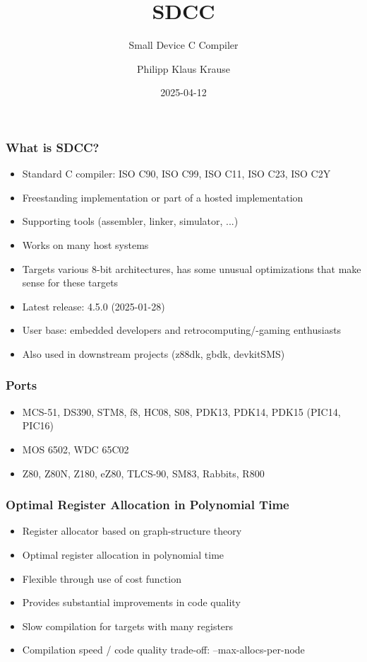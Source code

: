 \documentclass[xcolor=dvipsnames]{beamer}
\title{SDCC}
\subtitle{Small Device C Compiler}
\date{2025-04-12}
\author{Philipp Klaus Krause}
\begin{document}
\begin{frame}
	\titlepage
\end{frame}

\begin{frame}
	\frametitle{What is SDCC?}
	\begin{itemize}
		\item Standard C compiler: ISO C90, ISO C99, ISO C11, ISO C23, ISO C2Y
		\item Freestanding implementation or part of a hosted implementation
		\item Supporting tools (assembler, linker, simulator, ...)
		\item Works on many host systems
		\item Targets various 8-bit architectures, has some unusual optimizations that make sense for these targets
		\item Latest release: 4.5.0 (2025-01-28)
		\item User base: embedded developers and retrocomputing/-gaming enthusiasts
		\item Also used in downstream projects (z88dk, gbdk, devkitSMS)
	\end{itemize}
\end{frame}

\begin{frame}
	\frametitle{Ports}
	\begin{itemize}
		\item MCS-51, DS390, STM8, f8, HC08, S08, PDK13, PDK14, PDK15 (PIC14, PIC16)
		\item MOS 6502, WDC 65C02
		\item Z80, Z80N, Z180, eZ80, TLCS-90, SM83, Rabbits, R800
	\end{itemize}
\end{frame}

\begin{frame}
	\frametitle{Optimal Register Allocation in Polynomial Time}
	\begin{itemize}
		\item Register allocator based on graph-structure theory
		\item Optimal register allocation in polynomial time
		\item Flexible through use of cost function
		\item Provides substantial improvements in code quality
		\item Slow compilation for targets with many registers
		\item Compilation speed / code quality trade-off: --max-allocs-per-node
	\end{itemize}
\end{frame}
\end{document}
